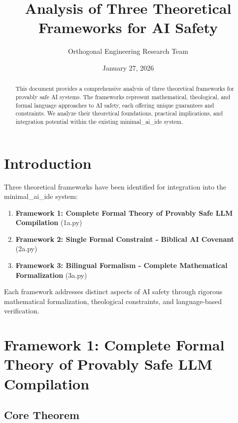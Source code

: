 \documentclass[12pt]{article}
\title{Analysis of Three Theoretical Frameworks for AI Safety}
\author{Orthogonal Engineering Research Team}
\date{January 27, 2026}
\begin{document}
\maketitle

\begin{abstract}
This document provides a comprehensive analysis of three theoretical frameworks for provably safe AI systems. The frameworks represent mathematical, theological, and formal language approaches to AI safety, each offering unique guarantees and constraints. We analyze their theoretical foundations, practical implications, and integration potential within the existing minimal\_ai\_ide system.
\end{abstract}

\tableofcontents

\section{Introduction}

Three theoretical frameworks have been identified for integration into the minimal\_ai\_ide system:

\begin{enumerate}
    \item \textbf{Framework 1: Complete Formal Theory of Provably Safe LLM Compilation} (1a.py)
    \item \textbf{Framework 2: Single Formal Constraint - Biblical AI Covenant} (2a.py)
    \item \textbf{Framework 3: Bilingual Formalism - Complete Mathematical Formalization} (3a.py)
\end{enumerate}

Each framework addresses distinct aspects of AI safety through rigorous mathematical formalization, theological constraints, and language-based verification.

\section{Framework 1: Complete Formal Theory of Provably Safe LLM Compilation}

\subsection{Core Theorem}
\end{document}
